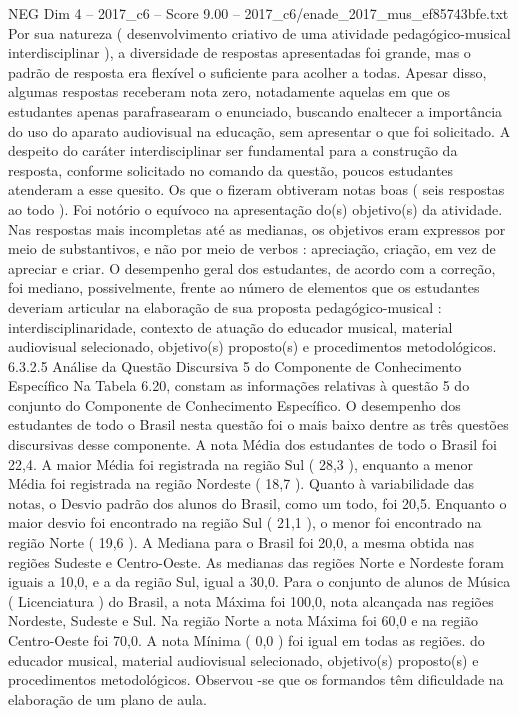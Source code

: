 \begin{textsample}{NEG Dim 4 – 2017\_c6 – Score 9.00 – 2017\_c6/enade\_2017\_mus\_ef85743bfe.txt}
Por sua natureza ( desenvolvimento criativo de uma atividade pedagógico-musical interdisciplinar ), a diversidade de respostas apresentadas foi grande, mas o padrão de resposta era flexível o suficiente para acolher a todas.
Apesar disso, algumas respostas receberam nota zero, notadamente aquelas em que os estudantes apenas parafrasearam o enunciado, buscando enaltecer a importância do uso do aparato audiovisual na educação, sem apresentar o que foi solicitado.
A despeito do caráter interdisciplinar ser fundamental para a construção da resposta, conforme solicitado no comando da questão, poucos estudantes atenderam a esse quesito.
Os que o fizeram obtiveram notas boas ( seis respostas ao todo ).
Foi notório o equívoco na apresentação do(s) objetivo(s) da atividade.
Nas respostas mais incompletas até as medianas, os objetivos eram expressos por meio de substantivos, e não por meio de verbos : apreciação, criação, em vez de apreciar e criar.
O desempenho geral dos estudantes, de acordo com a correção, foi mediano, possivelmente, frente ao número de elementos que os estudantes deveriam articular na elaboração de sua proposta pedagógico-musical : interdisciplinaridade, contexto de atuação do educador musical, material audiovisual selecionado, objetivo(s) proposto(s) e procedimentos metodológicos. 6.3.2.5 Análise da Questão Discursiva 5 do Componente de Conhecimento Específico Na Tabela 6.20, constam as informações relativas à questão 5 do conjunto do Componente de Conhecimento Específico.
O desempenho dos estudantes de todo o Brasil nesta questão foi o mais baixo dentre as três questões discursivas desse componente.
A nota Média dos estudantes de todo o Brasil foi 22,4.
A maior Média foi registrada na região Sul ( 28,3 ), enquanto a menor Média foi registrada na região Nordeste ( 18,7 ).
Quanto à variabilidade das notas, o Desvio padrão dos alunos do Brasil, como um todo, foi 20,5.
Enquanto o maior desvio foi encontrado na região Sul ( 21,1 ), o menor foi encontrado na região Norte ( 19,6 ).
A Mediana para o Brasil foi 20,0, a mesma obtida nas regiões Sudeste e Centro-Oeste.
As medianas das regiões Norte e Nordeste foram iguais a 10,0, e a da região Sul, igual a 30,0.
Para o conjunto de alunos de Música ( Licenciatura ) do Brasil, a nota Máxima foi 100,0, nota alcançada nas regiões Nordeste, Sudeste e Sul.
Na região Norte a nota Máxima foi 60,0 e na região Centro-Oeste foi 70,0.
A nota Mínima ( 0,0 ) foi igual em todas as regiões. do educador musical, material audiovisual selecionado, objetivo(s) proposto(s) e procedimentos metodológicos.
Observou -se que os formandos têm dificuldade na elaboração de um plano de aula.

\end{textsample}
